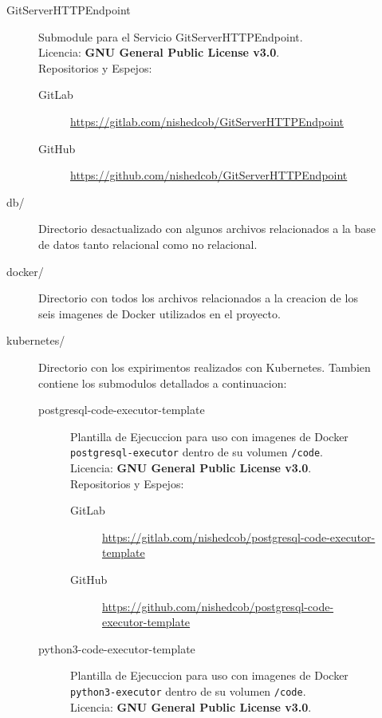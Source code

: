 \begin{description}
\begin{description}
\begin{description}
\begin{description}
            \end{description}
        \end{description}
        \item[GitServerHTTPEndpoint] Submodule para el Servicio GitServerHTTPEndpoint. \\
        Licencia: \textbf{GNU General Public License v3.0}. \\
        Repositorios y Espejos:
        \begin{description}
        	\item[GitLab] \sloppy \url{https://gitlab.com/nishedcob/GitServerHTTPEndpoint}
            \item[GitHub] \sloppy \url{https://github.com/nishedcob/GitServerHTTPEndpoint}
        \end{description}
        \item[db/] Directorio desactualizado con algunos archivos relacionados a la base de datos tanto relacional como no relacional.
        \item[docker/] Directorio con todos los archivos relacionados a la creacion de los seis imagenes de Docker utilizados en el proyecto.
        \item[kubernetes/] Directorio con los expirimentos realizados con Kubernetes. Tambien contiene los submodulos detallados a continuacion:
        \begin{description}
        	\item[postgresql-code-executor-template] Plantilla de Ejecuccion para uso con imagenes de Docker \texttt{postgresql-executor} dentro de su volumen \texttt{/code}.\\
            Licencia: \textbf{GNU General Public License v3.0}. \\
            Repositorios y Espejos:
            \begin{description}
            	\item[GitLab] \sloppy \url{https://gitlab.com/nishedcob/postgresql-code-executor-template}
                \item[GitHub] \sloppy \url{https://github.com/nishedcob/postgresql-code-executor-template}
            \end{description}
        	\item[python3-code-executor-template] Plantilla de Ejecuccion para uso con imagenes de Docker \texttt{python3-executor} dentro de su volumen \texttt{/code}.\\
            Licencia: \textbf{GNU General Public License v3.0}. \\

\end{description}
\end{description}
\end{description}
